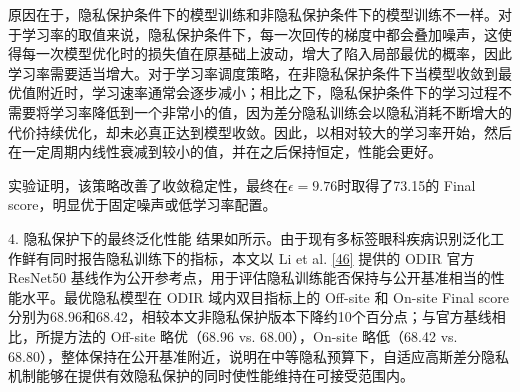 原因在于，隐私保护条件下的模型训练和非隐私保护条件下的模型训练不一样。对于学习率的取值来说，隐私保护条件下，每一次回传的梯度中都会叠加噪声，这使得每一次模型优化时的损失值在原基础上波动，增大了陷入局部最优的概率，因此学习率需要适当增大。对于学习率调度策略，在非隐私保护条件下当模型收敛到最优值附近时，学习速率通常会逐步减小；相比之下，隐私保护条件下的学习过程不需要将学习率降低到一个非常小的值，因为差分隐私训练会以隐私消耗不断增大的代价持续优化，却未必真正达到模型收敛。因此，以相对较大的学习率开始，然后在一定周期内线性衰减到较小的值，并在之后保持恒定，性能会更好。

实验证明，该策略改善了收敛稳定性，最终在\(\epsilon = 9.76\)时取得了73.15的 Final score，明显优于固定噪声或低学习率配置。

4. 隐私保护下的最终泛化性能 结果如所示。由于现有多标签眼科疾病识别泛化工作鲜有同时报告隐私训练下的指标，本文以 Li et al. \hyperref[_Ref213949402]{{[}46{]}} 提供的 ODIR 官方 ResNet50 基线作为公开参考点，用于评估隐私训练能否保持与公开基准相当的性能水平。最优隐私模型在 ODIR 域内双目指标上的 Off-site 和 On-site Final score 分别为68.96和68.42，相较本文非隐私保护版本下降约10个百分点；与官方基线相比，所提方法的 Off-site 略优（68.96 vs. 68.00），On-site 略低（68.42 vs. 68.80），整体保持在公开基准附近，说明在中等隐私预算下，自适应高斯差分隐私机制能够在提供有效隐私保护的同时使性能维持在可接受范围内。


